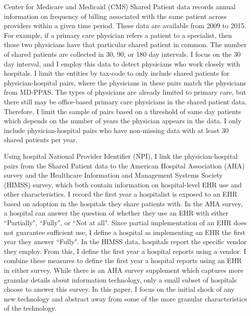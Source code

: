 \documentclass[12pt]{article}
\begin{document}
Center for Medicare and Medicaid (CMS) Shared Patient data records annual information on frequency of billing associated with the same patient across providers within a given time period. These data are available from 2009 to 2015. For example, if a primary care physician refers a patient to a specialist, then those two physicians have that particular shared patient in common. The number of shared patients are collected in 30, 90, or 180 day intervals. I focus on the 30 day interval, and I employ this data to detect physicians who work closely with hospitals. I limit the entities by tax-code to only include shared patients for physician-hospital pairs, where the physicians in these pairs match the physicians from MD-PPAS. The types of physicians are already limited to primary care, but there still may be office-based primary care physicians in the shared patient data. Therefore, I limit the sample of pairs based on a threshold of same day patients which depends on the number of years the physician appears in the data. I only include physician-hospital pairs who have non-missing data with at least 30 shared patients per year.


Using hospital National Provider Identifier (NPI), I link the physician-hospital pairs from the Shared Patient data to the American Hospital Association (AHA) survey and the Healthcare Information and Management Systems Society (HIMSS) survey, which both contain information on hospital-level EHR use and other characteristics. I record the first year a hospitalist is exposed to an EHR based on adoption in the hospitals they share patients with. In the AHA survey, a hospital can answer the question of whether they use an EHR with either ``Partially", ``Fully", or ``Not at all". Since partial implementation of an EHR does not guarantee sufficient use, I define a hospital as implementing an EHR the first year they answer ``Fully". In the HIMSS data, hospitals report the specific vendor they employ. From this, I define the first year a hospital reports using a vendor. I combine these measures to define the first year a hospital reports using an EHR in either survey. While there is an AHA survey supplement which captures more granular details about information technology, only a small subset of hospitals choose to answer this survey. In this paper, I focus on the initial shock of any new technology and abstract away from some of the more granular characteristics of the technology.
\end{document}
